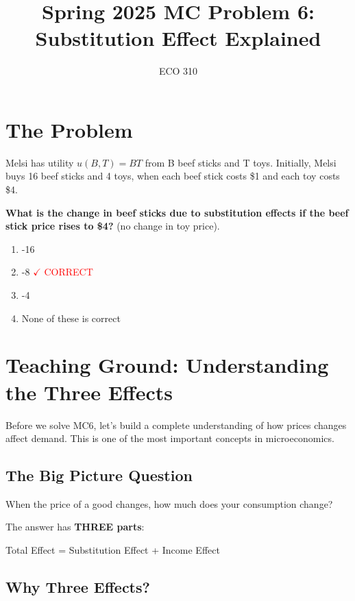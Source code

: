\documentclass[11pt]{article}
\title{Spring 2025 MC Problem 6: Substitution Effect Explained}
\author{ECO 310}
\date{}
\begin{document}
\maketitle

\section{The Problem}

Melsi has utility $u(B,T) = BT$ from B beef sticks and T toys. Initially, Melsi buys 16 beef sticks and 4 toys, when each beef stick costs \$1 and each toy costs \$4.

\textbf{What is the change in beef sticks due to substitution effects if the beef stick price rises to \$4?} (no change in toy price).

\begin{enumerate}
    \item[(a)] -16
    \item[(b)] -8 \quad \textcolor{red}{$\checkmark$ CORRECT}
    \item[(c)] -4
    \item[(d)] None of these is correct
\end{enumerate}

\newpage

\section{Teaching Ground: Understanding the Three Effects}

Before we solve MC6, let's build a complete understanding of how prices changes affect demand. This is one of the most important concepts in microeconomics.

\subsection{The Big Picture Question}

When the price of a good changes, how much does your consumption change?

The answer has \textbf{THREE parts}:

\begin{center}
\Large
\colorbox{blue!10}{Total Effect} = \colorbox{purple!10}{Substitution Effect} + \colorbox{orange!10}{Income Effect}
\end{center}

\subsection{Why Three Effects?}
\end{document}

